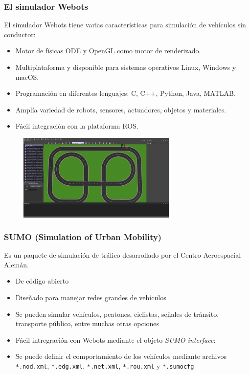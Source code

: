 \begin{frame}\frametitle{El simulador Webots}
  El simulador Webots tiene varias características para simulación de vehículos sin conductor:
  \begin{itemize}
  \item Motor de físicas ODE y OpenGL como motor de renderizado.
  \item Multiplataforma y disponible para sistemas operativos Linux, Windows y macOS.
  \item Programación en diferentes lenguajes: C, C++, Python, Java, MATLAB.
  \item Amplía variedad de robots, sensores, actuadores, objetos y materiales.
  \item Fácil integración con la plataforma ROS.
  \end{itemize}
  \begin{figure}
    \centering
    \includegraphics[width=0.7\textwidth]{Figuras/WebotsExample.png}
  \end{figure}
\end{frame}

\begin{frame}\frametitle{SUMO (Simulation of Urban Mobility)}
  Es un paquete de simulación de tráfico desarrollado por el Centro Aeroespacial Alemán.
  \begin{itemize}
  \item De código abierto
  \item Diseñado para manejar redes grandes de vehículos
  \item Se pueden simular vehículos, peatones, ciclistas, señales de tránsito, transporte público, entre muchas otras opciones
  \item Fácil intregración con Webots mediante el objeto \textit{SUMO interface}:
  \item Se puede definir el comportamiento de los vehículos mediante archivos \texttt{*.nod.xml}, \texttt{*.edg.xml}, \texttt{*.net.xml}, \texttt{*.rou.xml} y \texttt{*.sumocfg}
  \end{itemize}
\end{frame}

